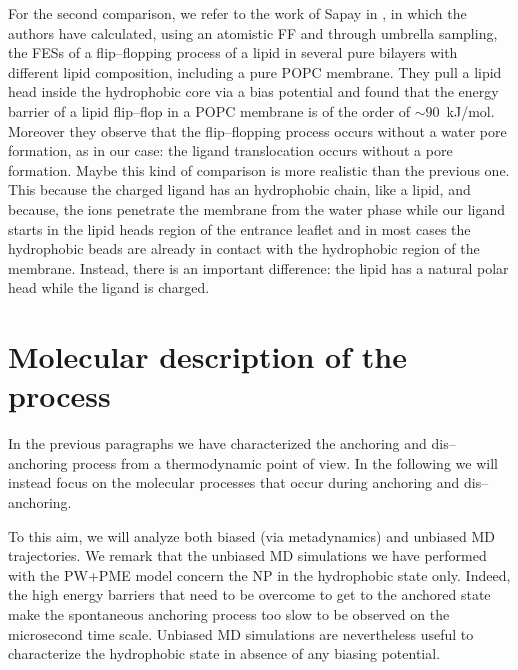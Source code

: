 For the second comparison, we refer to the work of Sapay \etal{} in \cite{Sapay2009}, in which the authors have 
calculated, using an atomistic \ac{FF} and through umbrella sampling, the \acp{FES} of a flip--flopping process of 
a lipid in several pure bilayers with different lipid composition, including a pure \ac{POPC} membrane. They pull 
a lipid head inside the hydrophobic core via a bias potential and found that the energy barrier of a lipid 
flip--flop in a \ac{POPC} membrane is of the order of $\sim 90$~kJ/mol. Moreover they observe that the 
flip--flopping process occurs without a water pore formation, as in our case: the  ligand translocation occurs 
without a pore formation. Maybe this kind of comparison is more realistic than the previous one. This because the 
charged ligand has an hydrophobic chain, like a lipid, and because, the ions penetrate the membrane from the water 
phase while our ligand starts in the lipid heads region of the entrance leaflet and in most cases the hydrophobic 
beads are already in contact with the hydrophobic region of the membrane. Instead, there is an important 
difference: the lipid has a natural polar head while the ligand is charged.

\section{Molecular description of the process}
\label{sec:resultsUnBiased}
In the previous paragraphs we have characterized the anchoring and dis--anchoring process from a thermodynamic 
point of view. In the following we will instead focus on the molecular processes that occur during anchoring and 
dis--anchoring.

To this aim, we will analyze both biased (via metadynamics) and unbiased \ac{MD} trajectories. We remark that the 
unbiased \ac{MD} simulations we have performed with the \ac{PW}+\ac{PME} model concern the \ac{NP} in the 
hydrophobic state only. Indeed, the high energy barriers that need to be overcome to get to the anchored state 
make the spontaneous anchoring process too slow to be observed on the microsecond time scale. Unbiased \ac{MD} 
simulations are nevertheless useful to characterize the hydrophobic state in absence of any biasing potential.

